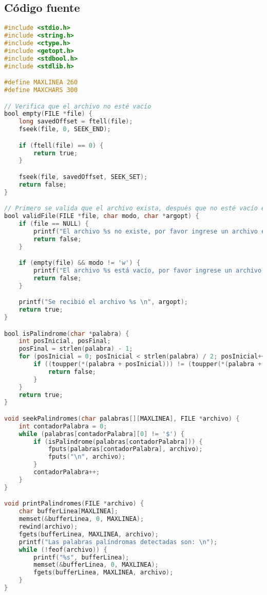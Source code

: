 \documentclass[a4paper]{article}
\begin{document}
\subsection{Código fuente}
\begin{lstlisting}[language=C]
#include <stdio.h>
#include <string.h>
#include <ctype.h>
#include <getopt.h>
#include <stdbool.h>
#include <stdlib.h>

#define MAXLINEA 260
#define MAXCHARS 300

// Verifica que el archivo no esté vacío
bool empty(FILE *file) {
    long savedOffset = ftell(file);
    fseek(file, 0, SEEK_END);

    if (ftell(file) == 0) {
        return true;
    }

    fseek(file, savedOffset, SEEK_SET);
    return false;
}

// Primero se valida que el archivo exista, después que no esté vacío en caso de ser archivo input
bool validFile(FILE *file, char modo, char *argopt) {
    if (file == NULL) {
        printf("El archivo %s no existe, por favor ingrese un archivo existente \n", argopt);
        return false;
    }

    if (empty(file) && modo != 'w') {
        printf("El archivo %s está vacío, por favor ingrese un archivo no vacío \n", argopt);
        return false;
    }

    printf("Se recibió el archivo %s \n", argopt);
    return true;
}

bool isPalindrome(char *palabra) {
    int posInicial, posFinal;
    posFinal = strlen(palabra) - 1;
    for (posInicial = 0; posInicial < strlen(palabra) / 2; posInicial++, posFinal--) {
        if ((toupper(*(palabra + posInicial))) != (toupper(*(palabra + posFinal)))) {
            return false;
        }
    }
    return true;
}

void seekPalindromes(char palabras[][MAXLINEA], FILE *archivo) {
    int contadorPalabra = 0;
    while (palabras[contadorPalabra][0] != '$') {
        if (isPalindrome(palabras[contadorPalabra])) {
            fputs(palabras[contadorPalabra], archivo);
            fputs("\n", archivo);
        }
        contadorPalabra++;
    }
}

void printPalindromes(FILE *archivo) {
    char bufferLinea[MAXLINEA];
    memset(&bufferLinea, 0, MAXLINEA);
    rewind(archivo);
    fgets(bufferLinea, MAXLINEA, archivo);
    printf("Las palabras palíndromas detectadas son: \n");
    while (!feof(archivo)) {
        printf("%s", bufferLinea);
        memset(&bufferLinea, 0, MAXLINEA);
        fgets(bufferLinea, MAXLINEA, archivo);
    }
}


\end{lstlisting}
\end{document}
